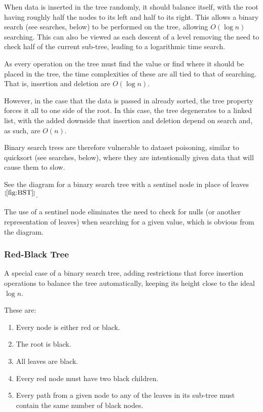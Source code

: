 \documentclass[]{article}
\begin{document}
When data is inserted in the tree randomly, it should balance itself, with the root having roughly half the nodes to its left and half to its right. This allows a binary search (see searches, below) to be performed on the tree, allowing $O(\log{n})$ searching. This can also be viewed as each descent of a level removing the need to check half of the current sub-tree, leading to a logarithmic time search.

As every operation on the tree must find the value or find where it should be placed in the tree, the time complexities of these are all tied to that of searching. That is, insertion and deletion are $O(\log{n})$.

However, in the case that the data is passed in already sorted, the tree property forces it all to one side of the root. In this case, the tree degenerates to a linked list, with the added downside that insertion and deletion depend on search and, as such, are $O(n)$.

Binary search trees are therefore vulnerable to dataset poisoning, similar to quicksort (see searches, below), where they are intentionally given data that will cause them to slow.

See the diagram for a binary search tree with a sentinel node in place of leaves$^{[\ref{fig:BST}]}$.

The use of a sentinel node eliminates the need to check for nulls (or another representation of leaves) when searching for a given value, which is obvious from the diagram.

\subsubsection{Red-Black Tree}

A special case of a binary search tree, adding restrictions that force insertion operations to balance the tree automatically, keeping its height close to the ideal $\log{n}$.

These are:

\begin{enumerate}
	\item Every node is either red or black.
	\item The root is black.
	\item All leaves are black. 
	\item Every red node must have two black children.
	\item Every path from a given node to any of the leaves in its sub-tree must contain the same number of black nodes.
\end{enumerate}
\end{document}
